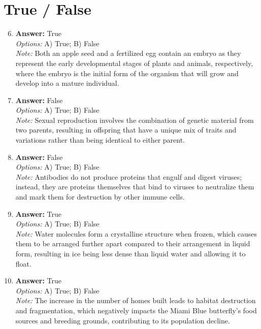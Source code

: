 \documentclass[12pt]{article}
\begin{document}
\section*{True / False}
\begin{enumerate}[label=\arabic*.]
\setcounter{enumi}{5}
\item \textbf{Answer:} True
\\ \textit{Options:} A) True; B) False
\\ \textit{Note:} Both an apple seed and a fertilized egg contain an embryo as they represent the early developmental stages of plants and animals, respectively, where the embryo is the initial form of the organism that will grow and develop into a mature individual.
\item \textbf{Answer:} False
\\ \textit{Options:} A) True; B) False
\\ \textit{Note:} Sexual reproduction involves the combination of genetic material from two parents, resulting in offspring that have a unique mix of traits and variations rather than being identical to either parent.
\item \textbf{Answer:} False
\\ \textit{Options:} A) True; B) False
\\ \textit{Note:} Antibodies do not produce proteins that engulf and digest viruses; instead, they are proteins themselves that bind to viruses to neutralize them and mark them for destruction by other immune cells.
\item \textbf{Answer:} True
\\ \textit{Options:} A) True; B) False
\\ \textit{Note:} Water molecules form a crystalline structure when frozen, which causes them to be arranged further apart compared to their arrangement in liquid form, resulting in ice being less dense than liquid water and allowing it to float.
\item \textbf{Answer:} True
\\ \textit{Options:} A) True; B) False
\\ \textit{Note:} The increase in the number of homes built leads to habitat destruction and fragmentation, which negatively impacts the Miami Blue butterfly's food sources and breeding grounds, contributing to its population decline.
\end{enumerate}
\end{document}
